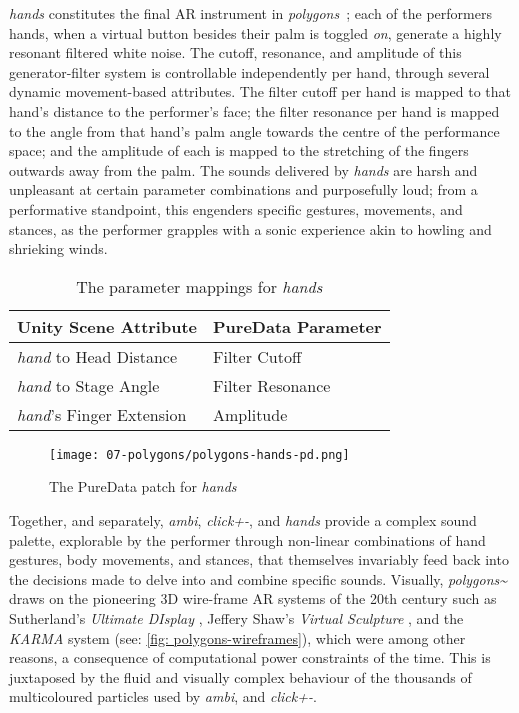 \textit{hands} constitutes the final AR instrument in \textit{polygons~}; each of the performers hands, when a virtual button besides their palm is toggled \textit{on}, generate a highly resonant filtered white noise. The cutoff, resonance, and amplitude of this generator-filter system is controllable independently per hand, through several dynamic movement-based attributes. The filter cutoff per hand is mapped to that hand's distance to the performer's face; the filter resonance per hand is mapped to the angle from that hand's palm angle towards the centre of the performance space; and the amplitude of each is mapped to the stretching of the fingers outwards away from the palm. The sounds delivered by \textit{hands} are harsh and unpleasant at certain parameter combinations and purposefully loud; from a performative standpoint, this engenders specific gestures, movements, and stances, as the performer grapples with a sonic experience akin to howling and shrieking winds.
\begin{table}
    \centering
    \begin{tabular}{ l|l }
        \textbf{Unity Scene Attribute}         & \textbf{PureData Parameter}    \\
        \hline      
        \textit{hand} to Head Distance         & Filter Cutoff                  \\
        \textit{hand} to Stage Angle           & Filter Resonance               \\
        \textit{hand}'s Finger Extension       & Amplitude               
    \end{tabular}
    \caption{The parameter mappings for \textit{hands}}
    \label{fig: polygons-hands-mapping}
\end{table}
\begin{figure}
    \centering
    \texttt{[image: 07-polygons/polygons-hands-pd.png]}
    \caption{The PureData patch for \textit{hands}}
    \label{fig: polygons-hands-pd}
\end{figure}

Together, and separately, \textit{ambi}, \textit{click+-}, and \textit{hands} provide a complex sound palette, explorable by the performer through non-linear combinations of hand gestures, body movements, and stances, that themselves invariably feed back into the decisions made to delve into and combine specific sounds. Visually, \textit{polygons\textasciitilde{}} draws on the pioneering 3D wire-frame AR systems of the 20th century such as Sutherland's \textit{Ultimate DIsplay} \citeyearpar{sutherland1968}, Jeffery Shaw's \textit{Virtual Sculpture} \citeyearpar{shaw1981}, and the \textit{KARMA} system \citep{feiner1993} (see: \autoref{fig: polygons-wireframes}), which were among other reasons, a consequence of computational power constraints of the time. This is juxtaposed by the fluid and visually complex behaviour of the thousands of multicoloured particles used by \textit{ambi}, and \textit{click+-}.

